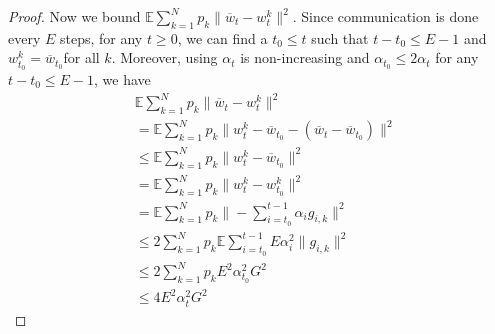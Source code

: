 \begin{proof}
	Now we bound $\mathbb{E}\sum_{k=1}^{N}p_{k}\|\overline{w}_{t}-w_{t}^{k}\|^{2}$.
	Since communication is done every $E$ steps, for any $t\geq0$, we
	can find a $t_{0}\leq t$ such that $t-t_{0}\leq E-1$ and $w_{t_{0}}^{k}=\overline{w}_{t_{0}}$for
	all $k$. Moreover, using $\alpha_{t}$ is non-increasing and $\alpha_{t_{0}}\leq2\alpha{}_{t}$
	for any $t-t_{0}\leq E-1$, we have 
	\begin{align*}
	& \mathbb{E}\sum_{k=1}^{N}p_{k}\|\overline{w}_{t}-w_{t}^{k}\|^{2}\\
	& =\mathbb{E}\sum_{k=1}^{N}p_{k}\|w_{t}^{k}-\overline{w}_{t_{0}}-(\overline{w}_{t}-\overline{w}_{t_{0}})\|^{2}\\
	& \leq\mathbb{E}\sum_{k=1}^{N}p_{k}\|w_{t}^{k}-\overline{w}_{t_{0}}\|^{2}\\
	& =\mathbb{E}\sum_{k=1}^{N}p_{k}\|w_{t}^{k}-w_{t_{0}}^{k}\|^{2}\\
	& =\mathbb{E}\sum_{k=1}^{N}p_{k}\|-\sum_{i=t_{0}}^{t-1}\alpha_{i}g_{i,k}\|^{2}\\
	& \leq2\sum_{k=1}^{N}p_{k}\mathbb{E}\sum_{i=t_{0}}^{t-1}E\alpha_{i}^{2}\|g_{i,k}\|^{2}\\
	& \leq2\sum_{k=1}^{N}p_{k}E^{2}\alpha_{t_{0}}^{2}G^{2}\\
	& \leq4E^{2}\alpha_{t}^{2}G^{2}
	\end{align*}
	\begin{comment}
	Alternatively, we can also write
	\begin{align*}
	\sum_{k=1}^{N}p_{k}\|\overline{w}_{t}-w_{t}^{k}\|^{2} & =\sum_{k=1}^{N}p_{k}\|\overline{w}_{t-1}-\alpha_{t-1}g_{t-1}-w_{t-1}^{k}+\alpha_{t-1}g_{t-1,k}\|^{2}\\
	& \leq2\sum_{k=1}^{N}p_{k}\left(\|\overline{w}_{t-1}-w_{t-1}^{k}\|^{2}+\|\alpha_{t-1}g_{t-1}-\alpha_{t-1}g_{t-1,k}\|^{2}\right)
	\end{align*}
	and write 
	\begin{align*}
	\sum_{k}p_{k}\|g_{t-1,k}-g_{t-1}\|^{2}\leq\sum_{k}p_{k}\|g_{t-1,k}\|^{2} & =\sum_{k}p_{k}\|g_{t-1,k}-\nabla F_{k}(w_{t-1}^{k})+\nabla F_{k}(w_{t-1}^{k})\|^{2}\\
	& \leq2\sum_{k}p_{k}\|g_{t-1,k}-\nabla F_{k}(w_{t-1}^{k})\|^{2}+2\sum_{k}p_{k}\|\nabla F_{k}(w_{t-1}^{k})\|^{2}\\
	& \leq2\sum_{k}p_{k}\sigma_{k}^{2}+2\sum_{k}p_{k}\|\nabla F_{k}(w_{t-1}^{k})-\nabla F_{k}(\overline{w}_{t-1})+\nabla F_{k}(\overline{w}_{t-1})\|^{2}\\
	& \leq2\sum_{k}p_{k}\sigma_{k}^{2}+4\sum_{k}p_{k}\left(\|\nabla F_{k}(w_{t-1}^{k})-\nabla F_{k}(\overline{w}_{t-1})\|^{2}+\|\nabla F_{k}(\overline{w}_{t-1})\|^{2}\right)\\

\end{comment}
\end{proof}
